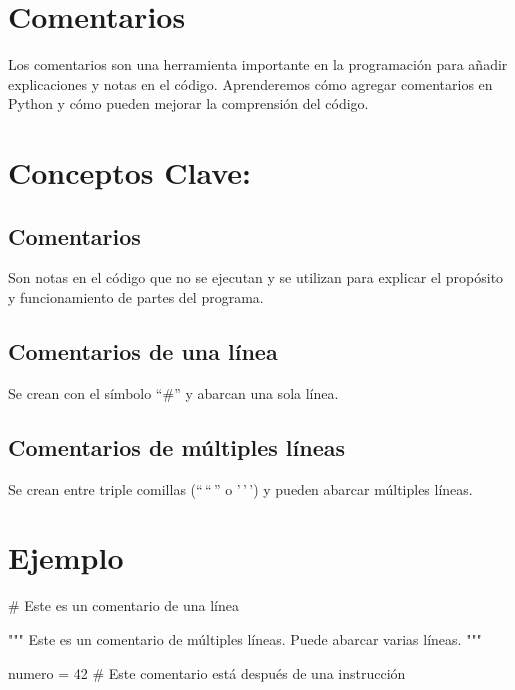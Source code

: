 \documentclass[
  a4paper,
  DIV=11,
  numbers=noendperiod,
  onepage,
  openany]{scrreprt}
\newenvironment{Shaded}{\begin{snugshade}}{\end{snugshade}}
\newcommand{\CommentTok}[1]{\textcolor[rgb]{0.37,0.37,0.37}{#1}}
\newcommand{\DecValTok}[1]{\textcolor[rgb]{0.68,0.00,0.00}{#1}}
\newcommand{\NormalTok}[1]{\textcolor[rgb]{0.00,0.23,0.31}{#1}}
\newcommand{\OperatorTok}[1]{\textcolor[rgb]{0.37,0.37,0.37}{#1}}
\begin{document}
\hypertarget{comentarios-2}{%
\section{Comentarios}\label{comentarios-2}}

Los comentarios son una herramienta importante en la programación para
añadir explicaciones y notas en el código. Aprenderemos cómo agregar
comentarios en Python y cómo pueden mejorar la comprensión del código.

\hypertarget{conceptos-clave-9}{%
\section{Conceptos Clave:}\label{conceptos-clave-9}}

\hypertarget{comentarios-3}{%
\subsection{Comentarios}\label{comentarios-3}}

Son notas en el código que no se ejecutan y se utilizan para explicar el
propósito y funcionamiento de partes del programa.

\hypertarget{comentarios-de-una-luxednea-1}{%
\subsection{Comentarios de una
línea}\label{comentarios-de-una-luxednea-1}}

Se crean con el símbolo ``\#'' y abarcan una sola línea.

\hypertarget{comentarios-de-muxfaltiples-luxedneas-1}{%
\subsection{Comentarios de múltiples
líneas}\label{comentarios-de-muxfaltiples-luxedneas-1}}

Se crean entre triple comillas (``\,``\,'' o '\,'\,') y pueden abarcar
múltiples líneas.

\hypertarget{ejemplo-9}{%
\section{Ejemplo}\label{ejemplo-9}}

\begin{Shaded}
\begin{Highlighting}[]
\CommentTok{\# Este es un comentario de una línea}

\CommentTok{"""}
\CommentTok{Este es un comentario}
\CommentTok{de múltiples líneas.}
\CommentTok{Puede abarcar varias líneas.}
\CommentTok{"""}

\NormalTok{numero }\OperatorTok{=} \DecValTok{42}  \CommentTok{\# Este comentario está después de una instrucción}
\end{Highlighting}
\end{Shaded}
\end{document}

